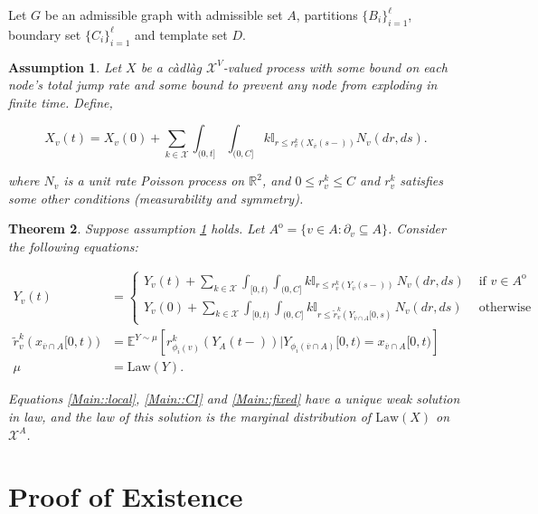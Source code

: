 \documentclass[12pt]{article}
\newcommand{\mb}{\mathbb}
\newcommand{\mc}{\mathcal}
\newcommand{\ov}{\overline}
\newcommand{\te}{\text}
\newcommand{\exmu}[2]{\mb{E}^{#1}\left[#2\right]}	%
\newcommand{\sta}{\mc{X}}							%
\newcommand{\neigh}[1]{\partial_{#1}}				%
\newcommand{\cl}[1]{\ov{#1}}						%
\newcommand{\Xf}{X}									%
\newcommand{\poiss}{N}								%
\newcommand{\poissv}[1]{_{#1}}						%
\newcommand{\vind}[1]{_{#1}}						%
\newcommand{\tme}[1]{(#1)}							%
\newcommand{\tmi}[1]{#1}							%
\newcommand{\intA}{A^\mathrm{o}}
\newcommand{\Xg}{Y}
\newcommand{\alt}[1]{\tilde{#1}}
\newcommand{\law}{\te{Law}}
\newtheorem{thms}{Theorem}[section]
\newtheorem{assu}[thms]{Assumption}
\begin{document}
Let \(G\) be an admissible graph with admissible set \(A\), partitions \(\{B_i\}_{i=1}^\ell\), boundary set \(\{C_i\}_{i=1}^\ell\) and template set \(D\).

\begin{assu}
Let \(\Xf\) be a c\`adl\`ag \(\sta^V\)-valued process with some bound on each node's total jump rate and some bound to prevent any node from exploding in finite time. Define,

\begin{equation}
\Xf\vind{v}\tme{t} = \Xf\vind{v}\tme{0} + \sum_{k \in \sta}\int_{(0,t]}\int_{(0,C]} k\mb{I}_{r\leq r_v^k(\Xf\vind{\cl{v}}\tme{s-})} \poiss\poissv{v}(dr,ds).
\label{Main::full}
\end{equation}

where \(\poiss\poissv{v}\) is a unit rate Poisson process on \(\mb{R}^2\), and \(0 \leq r_v^k \leq C\) and \(r_v^k\) satisfies some other conditions (measurability and symmetry).
\label{Main::Xassu}
\end{assu}


\begin{thms}
Suppose assumption \ref{Main::Xassu} holds. Let \(\intA = \{v \in A: \neigh{v} \subseteq A\}\). Consider the following equations:

\begin{align}
\Xg\vind{v}\tme{t} &= 
\begin{cases}
\Xg\vind{v}\tme{t} + \sum_{k \in \sta} \int_{[0,t)}\int_{(0,C]} k\mb{I}_{r\leq r^k_v(\Xg\vind{\cl{v}}\tme{s-})}\,\poiss\poissv{v}(dr,ds) & \te{ if } v \in \intA\\
\Xg\vind{v}\tme{0} + \sum_{k \in \sta} \int_{[0,t)}\int_{(0,C]} k\mb{I}_{r\leq \alt{r}^k_v(\Xg\vind{\cl{v}\cap A}\tmi{[0,s)}}\,\poiss\poissv{v}(dr,ds) &\te{ otherwise}
\end{cases}\label{Main::local}\\
\alt{r}^k_v(x_{\cl{v}\cap A}[0,t)) &= \exmu{\Xg \sim \mu}{r^k_{\phi_i(v)}(\Xg\vind{A}\tme{t-})|\Xg\vind{\phi_i(\cl{v}\cap A)}\tmi{[0,t)} = x\vind{\cl{v}\cap A}\tmi{[0,t)}}\label{Main::CI}\\
\mu &= \law(\Xg).\label{Main::fixed}
\end{align}

Equations \eqref{Main::local}, \eqref{Main::CI} and \eqref{Main::fixed} have a unique weak solution in law, and the law of this solution is the marginal distribution of \(\law(\Xf)\) on \(\sta^A\).
\end{thms}

\section{Proof of Existence}
\label{Ex}
\end{document}
